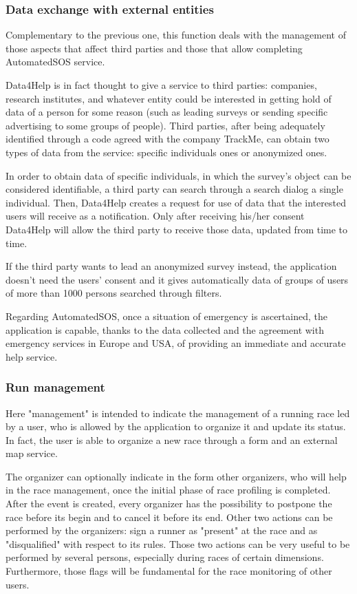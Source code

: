 \subsubsection{Data exchange with external entities}
Complementary to the previous one, this function deals with the management of those aspects that affect third parties and those that allow completing AutomatedSOS service.

Data4Help is in fact thought to give a service to third parties: companies, research institutes, and whatever entity could be interested in getting hold of data of a person for some reason (such as leading surveys or sending specific advertising to some groups of people). Third parties, after being adequately identified through a code agreed with the company TrackMe, can obtain two types of data from the service: specific individuals ones or anonymized ones.

In order to obtain data of specific individuals, in which the survey's object can be considered identifiable, a third party can search through a search dialog a single individual. Then, Data4Help creates a request for use of data that the interested users will receive as a notification. Only after receiving his/her consent Data4Help will allow the third party to receive those data, updated from time to time.

If the third party wants to lead an anonymized survey instead, the application doesn't need the users' consent and it gives automatically data of groups of users of more than 1000 persons searched through filters.

Regarding AutomatedSOS, once a situation of emergency is ascertained, the application is capable, thanks to the data collected and the agreement with emergency services in Europe and USA, of providing an immediate and accurate help service. 

\subsubsection{Run management} 
Here "management" is intended to indicate the management of a running race led by a user, who is allowed by the application to organize it and update its status. In fact, the user is able to organize a new race through a form and an external map service.

The organizer can optionally indicate in the form other organizers, who will help in the race management, once the initial phase of race profiling is completed. After the event is created, every organizer has the possibility to postpone the race before its begin and to cancel it before its end. Other two actions can be performed by the organizers: sign a runner as "present" at the race and as "disqualified" with respect to its rules. Those two actions can be very useful to be performed by several persons, especially during races of certain dimensions. Furthermore, those flags will be fundamental for the race monitoring of other users.


